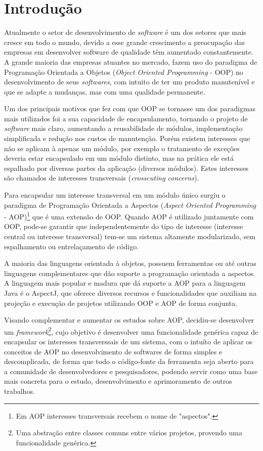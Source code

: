 \documentclass[tc,oneside]{iiufrgs}
\begin{document}

\chapter{Introdução}
\label{cap1}
Atualmente o setor de desenvolvimento de \textit{software} é um dos setores que mais cresce em todo o mundo, devido a esse grande crescimento a preocupação das empresas em desenvolver software de qualidade têm aumentado constantemente. A grande maioria das empresas atuantes no mercado, fazem uso do paradigma de Programação Orientada a Objetos (\textit{Object Oriented Programming} - OOP) no desenvolvimento de seus \textit{softwares}, com intuito de ter um produto manutenível e que se adapte a mudanças, mas com uma qualidade permanente.

Um dos principais motivos que fez com que OOP se tornasse um dos paradigmas mais utilizados foi a sua capacidade de encapsulamento, tornando o projeto de \textit{software} mais claro, aumentando a reusabilidade de módulos, implementação simplificada e redução nos custos de manutenção. Porém existem interesses que não se aplicam à apenas um módulo, por exemplo o tratamento de exceções deveria estar encapsulado em um módulo distinto, mas na prática ele está espalhado por diversas partes da aplicação (diversos módulos). Estes interesses são chamados de interesses transversais (\textit{crosscuting concerns}).

Para encapsular um interesse transversal em um módulo único surgiu o paradigma de Programação Orientada a Aspectos (\textit{Aspect Oriented Programming} - AOP)\footnote{Em AOP interesses transversais recebem o nome de "aspectos".} que é uma extensão de OOP. Quando AOP é utilizado juntamente com OOP, pode-se garantir que independentemente do tipo de interesse (interesse central ou interesse transversal) tem-se um sistema altamente modularizado, sem espalhamento ou entrelaçamento de código.

A maioria das linguagens orientada à objetos, possuem ferramentas ou até outras linguagens complementares que dão suporte a programação orientada a aspectos. A linguagem mais popular e madura que dá suporte a AOP para a linguagem Java é o AspectJ, que oferece diversos recursos e funcionalidades que auxiliam na projeção e execução de projetos utilizando OOP e AOP de forma conjunta.

Visando complementar e aumentar os estudos sobre AOP, decidiu-se desenvolver um \textit{framework}\footnote{Uma abstração entre classes comuns entre vários projetos, provendo uma funcionalidade genérica.}, cujo objetivo é desenvolver uma funcionalidade genérica capaz de encapsular os interesses transverssais de um sistema, com o intuíto de aplicar os conceitos de AOP no desenvolvimento de softwares de forma simples e descomplicada, de forma que todo o código-fonte da ferramenta seja aberto para a comunidade de desenvolvedores e pesquisadores, podendo servir como uma base mais concreta para o estudo, desenvolvimento e aprimoramento de outros trabalhos.
\end{document}
